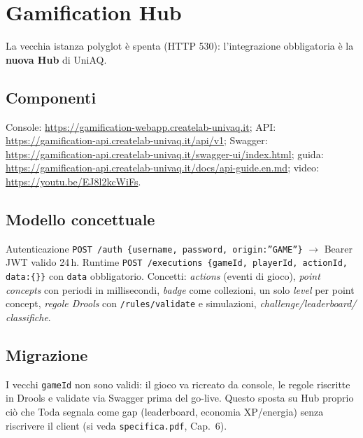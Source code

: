 \chapter{Gamification Hub}
\label{ch:hubteoria}
La vecchia istanza polyglot è spenta (HTTP 530): l'integrazione obbligatoria
è la \textbf{nuova Hub} di UniAQ.

\section{Componenti}
Console: \url{https://gamification-webapp.createlab-univaq.it};
API: \url{https://gamification-api.createlab-univaq.it/api/v1};
Swagger: \url{https://gamification-api.createlab-univaq.it/swagger-ui/index.html};
guida: \url{https://gamification-api.createlab-univaq.it/docs/api-guide.en.md};
video: \url{https://youtu.be/EJ8l2kcWiFs}.

\section{Modello concettuale}
Autenticazione \texttt{POST /auth \{username, password, origin:''GAME''\}}
$\rightarrow$ Bearer JWT valido 24\,h. Runtime
\texttt{POST /executions \{gameId, playerId, actionId, data:\{\}\}} con
\texttt{data} obbligatorio. Concetti: \textit{actions} (eventi di gioco),
\textit{point concepts} con periodi in millisecondi, \textit{badge} come
collezioni, un solo \textit{level} per point concept, \textit{regole Drools}
con \texttt{/rules/validate} e simulazioni, \textit{challenge/leaderboard/
classifiche}.

\section{Migrazione}
I vecchi \texttt{gameId} non sono validi: il gioco va ricreato da console,
le regole riscritte in Drools e validate via Swagger prima del go-live.
Questo sposta su Hub proprio ciò che Toda segnala come gap (leaderboard,
economia XP/energia) senza riscrivere il client (si veda \texttt{specifica.pdf},
Cap.~6).
